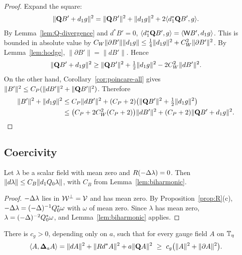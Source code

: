\begin{proof}
Expand the square:
\[
\|\mathbf Q B'+d_1 g\|^2=\|\mathbf Q B'\|^2+\|d_1 g\|^2+2\langle d_1^*\mathbf Q B',g\rangle .
\]
By Lemma~\ref{lem:Q-divergence} and $d^*B'=0$, $\langle d_1^*\mathbf Q B',g\rangle=\langle \mathsf WB',d_1 g\rangle$. This is bounded in absolute value by $C_W\|\partial B'\|\|d_1 g\|\le\frac14\|d_1 g\|^2+C_W^2\|\partial B'\|^2$. By Lemma~\ref{lem:hodge}, $\|\partial B'\|=\|dB'\|$. Hence
\[
\|\mathbf Q B'+d_1 g\|^2\ge\|\mathbf Q B'\|^2+\tfrac12\|d_1 g\|^2-2C_W^2\|dB'\|^2 .
\]
On the other hand, Corollary~\ref{cor:poincare-all} gives $\|B'\|^2\le C_P(\|dB'\|^2+\|\mathbf Q B'\|^2)$. Therefore
\begin{align*}
\|B'\|^2+\|d_1 g\|^2&\le C_P\|dB'\|^2+(C_P+2)\big(\|\mathbf Q B'\|^2+\tfrac12\|d_1 g\|^2\big)\\
&\le\big(C_P+2C_W^2(C_P+2)\big)\|dB'\|^2+(C_P+2)\|\mathbf Q B'+d_1 g\|^2 . \qedhere
\end{align*}
\end{proof}

\subsection{Coercivity}\label{ss:9.4}

\begin{lemma}\label{lem:gradient-part}
Let $\lambda$ be a scalar field with mean zero and $R(-\Delta\lambda)=0$. Then $\|d\lambda\|\le C_B\|d_1 Q_0\lambda\|$, with $C_B$ from Lemma~\ref{lem:biharmonic}.
\end{lemma}

\begin{proof}
$-\Delta\lambda$ lies in $\mathcal W^\perp=\mathcal V$ and has mean zero. By Proposition~\ref{prop:R}(c), $-\Delta\lambda=(-\Delta)^{-1}Q_0^*\omega$ with $\omega$ of mean zero. Since $\lambda$ has mean zero, $\lambda=(-\Delta)^{-2}Q_0^*\omega$, and Lemma~\ref{lem:biharmonic} applies.
\end{proof}

\begin{theorem}\label{thm:gauge-coercive}
There is $c_g>0$, depending only on $a$, such that for every gauge field $A$ on $\mathbb T_\eta$
\[
\ip A{\bL_aA}=\|dA\|^2+\|Rd^*A\|^2+a\|\bQ A\|^2\ \ge\ c_g\big(\|A\|^2+\|\partial A\|^2\big).
\]
\end{theorem}

